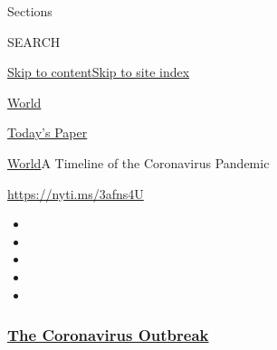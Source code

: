 Sections

SEARCH

\protect\hyperlink{site-content}{Skip to
content}\protect\hyperlink{site-index}{Skip to site index}

\href{https://www.nytimes3xbfgragh.onion/section/world}{World}

\href{https://myaccount.nytimes3xbfgragh.onion/auth/login?response_type=cookie\&client_id=vi}{}

\href{https://www.nytimes3xbfgragh.onion/section/todayspaper}{Today's
Paper}

\href{/section/world}{World}\textbar{}A Timeline of the Coronavirus
Pandemic

\url{https://nyti.ms/3afns4U}

\begin{itemize}
\item
\item
\item
\item
\item
\end{itemize}

\hypertarget{the-coronavirus-outbreak}{%
\subsubsection{\texorpdfstring{\href{https://www.nytimes3xbfgragh.onion/news-event/coronavirus?name=styln-coronavirus-national\&region=TOP_BANNER\&variant=undefined\&block=storyline_menu_recirc\&action=click\&pgtype=Article\&impression_id=c8d29900-e382-11ea-9004-a3db723e3d7e}{The
Coronavirus
Outbreak}}{The Coronavirus Outbreak}}\label{the-coronavirus-outbreak}}

